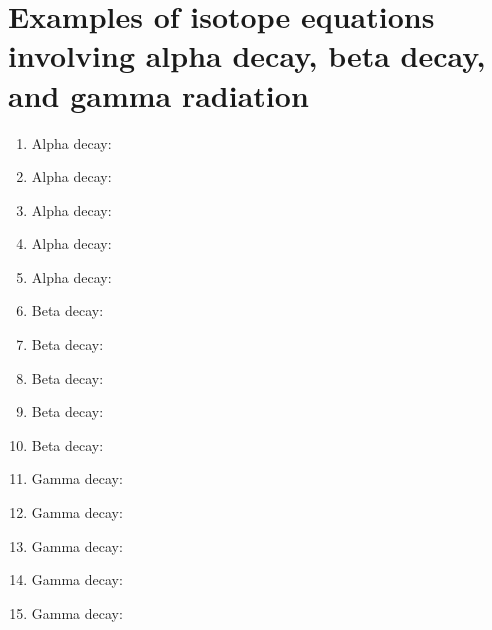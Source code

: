 \documentclass[border=5mm]{standalone}
\begin{document}
\begin{minipage}{\textwidth}

\section*{Examples of isotope equations involving alpha decay, beta decay, and gamma radiation}

\begin{enumerate}
  \item Alpha decay: 
  \item Alpha decay: 
  \item Alpha decay: 
  \item Alpha decay: 
  \item Alpha decay: 
  \item Beta decay: 
  \item Beta decay: 
  \item Beta decay: 
  \item Beta decay: 
  \item Beta decay: 
  \item Gamma decay: 
  \item Gamma decay: 
  \item Gamma decay: 
  \item Gamma decay: 
  \item Gamma decay: 
\end {enumerate}
\end {minipage}
\end{document}
